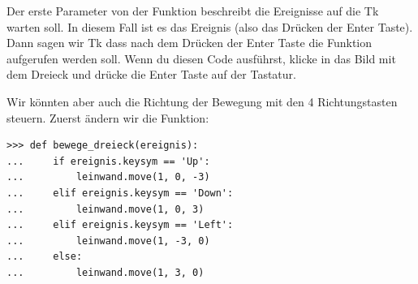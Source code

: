 Der erste Parameter von der  Funktion beschreibt die Ereignisse auf die Tk warten soll. In diesem Fall ist es das Ereignis  (also das Drücken der Enter Taste). Dann sagen wir Tk dass nach dem Drücken der Enter Taste die Funktion  aufgerufen werden soll. Wenn du diesen Code ausführst, klicke in das Bild mit dem Dreieck und drücke die Enter Taste auf der Tastatur.

Wir könnten aber auch die Richtung der Bewegung mit den 4 Richtungstasten steuern. Zuerst ändern wir die  Funktion:

\begin{Verbatim}[frame=single]
>>> def bewege_dreieck(ereignis):
...     if ereignis.keysym == 'Up':
...         leinwand.move(1, 0, -3)
...     elif ereignis.keysym == 'Down':
...         leinwand.move(1, 0, 3)
...     elif ereignis.keysym == 'Left':
...         leinwand.move(1, -3, 0)
...     else:
...         leinwand.move(1, 3, 0)
\end{Verbatim}

